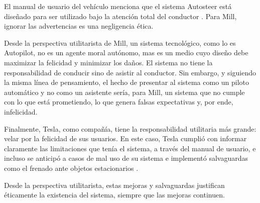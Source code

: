 El manual de usuario del vehículo menciona que el sistema Autosteer está diseñado para ser utilizado bajo la atención total del conductor \citep{nhtsa2017pe16007}. Para Mill, ignorar las advertencias es una negligencia ética.

\medskip

Desde la perspectiva utilitarista de Mill, un sistema tecnológico, como lo es Autopilot, no es un agente moral autónomo, mas es un medio cuyo diseño debe maximizar la felicidad y minimizar los daños. El sistema no tiene la responsabilidad de conducir sino de asistir al conductor. Sin embargo, y siguiendo la misma línea de pensamiento, el hecho de presentar al sistema como un piloto automático y no como un asistente sería, para Mill, un sistema que no cumple con lo que está prometiendo, lo que genera falsas expectativas y, por ende, infelicidad.

\medskip

Finalmente, Tesla, como compañía, tiene la responsabilidad utilitaria más grande: velar por la felicidad de sus usuarios. En este caso, Tesla cumplió con informar claramente las limitaciones que tenía el sistema, a través del manual de usuario, e incluso se anticipó a casos de mal uso de su sistema e implementó salvaguardas como el frenado ante objetos estacionarios \citep{nhtsa2017pe16007}.

Desde la perspectiva utilitarista, estas mejoras y salvaguardas justifican éticamente la existencia del sistema, siempre que las mejoras continuen.
